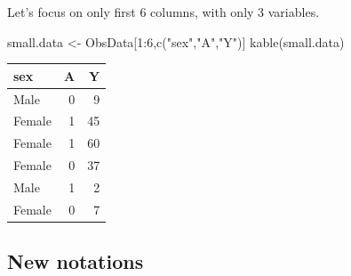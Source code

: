 \documentclass[
]{book}
\newenvironment{Shaded}{\begin{snugshade}}{\end{snugshade}}
\newcommand{\DecValTok}[1]{\textcolor[rgb]{0.00,0.00,0.81}{#1}}
\newcommand{\FunctionTok}[1]{\textcolor[rgb]{0.00,0.00,0.00}{#1}}
\newcommand{\NormalTok}[1]{#1}
\newcommand{\OtherTok}[1]{\textcolor[rgb]{0.56,0.35,0.01}{#1}}
\newcommand{\SpecialCharTok}[1]{\textcolor[rgb]{0.00,0.00,0.00}{#1}}
\newcommand{\StringTok}[1]{\textcolor[rgb]{0.31,0.60,0.02}{#1}}
\begin{document}
\begin{rmdcomment}
Let's focus on only first 6 columns, with only 3 variables.
\end{rmdcomment}

\begin{Shaded}
\begin{Highlighting}[]
\NormalTok{small.data }\OtherTok{\textless{}{-}}\NormalTok{ ObsData[}\DecValTok{1}\SpecialCharTok{:}\DecValTok{6}\NormalTok{,}\FunctionTok{c}\NormalTok{(}\StringTok{"sex"}\NormalTok{,}\StringTok{"A"}\NormalTok{,}\StringTok{"Y"}\NormalTok{)]}
\FunctionTok{kable}\NormalTok{(small.data)}
\end{Highlighting}
\end{Shaded}

\begin{tabular}{l|r|r}
\hline
sex & A & Y\\
\hline
Male & 0 & 9\\
\hline
Female & 1 & 45\\
\hline
Female & 1 & 60\\
\hline
Female & 0 & 37\\
\hline
Male & 1 & 2\\
\hline
Female & 0 & 7\\
\hline
\end{tabular}

\hypertarget{new-notations}{%
\subsection{New notations}\label{new-notations}}
\end{document}
